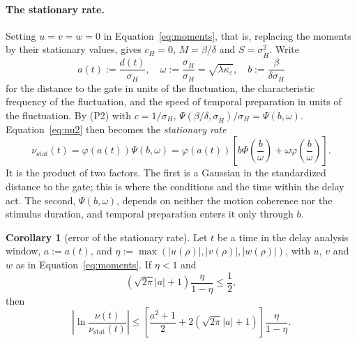 \documentclass[a4paper,11pt]{article}
\theoremstyle{definition}
\newtheorem{corollary}[proposition]{Corollary}
\newcommand{\nustat}{{\nu }_{\mathrm{stat}}}
\newcommand{\1}{\mathbbm{1}}
\begin{document}
\paragraph{The stationary rate.} Setting $u=v=w=0$ in Equation~\eqref{eq:moments}, that is, replacing the moments by their stationary values, gives ${c}_{H}=0$, $M=\beta /\delta $ and $S={\sigma }_{\dot{H}}^{2}$. Write
\begin{equation*}
a\left(t\right):=\frac{d\left(t\right)}{{\sigma }_{H}}, \quad \omega :=\frac{{\sigma }_{\dot{H}}}{{\sigma }_{H}}=\sqrt{\lambda \kappa_{\varepsilon} }, \quad b:=\frac{\beta}{\delta\sigma_{H}}
\end{equation*}
for the distance to the gate in units of the fluctuation, the characteristic frequency of the fluctuation, and the speed of temporal preparation in units of the fluctuation. By (P2) with $c=1/\sigma_{H}$, $\Psi\left(\beta/\delta,\sigma_{\dot{H}}\right)/\sigma_{H}=\Psi(b,\omega)$. Equation~\eqref{eq:nu2} then becomes the \emph{stationary rate}
\begin{equation}
\nustat \left(t\right)=\varphi \left(a\left(t\right)\right)\Psi(b,\omega)=\varphi \left(a\left(t\right)\right)\left[b\Phi \left(\frac{b}{\omega}\right)+\omega \varphi \left(\frac{b}{\omega}\right)\right].
\label{eq:nu_asymp}
\end{equation}
It is the product of two factors. The first is a Gaussian in the standardized distance to the gate; this is where the conditions and the time within the delay act. The second, $\Psi(b,\omega)$, depends on neither the motion coherence nor the stimulus duration, and temporal preparation enters it only through $b$.

\begin{corollary}[error of the stationary rate]\label{cor:approx}
Let $t$ be a time in the delay analysis window, $a:=a(t)$, and $\eta :=\max \left(\left|u\left(\rho \right)\right|,\left|v\left(\rho \right)\right|,\left|w\left(\rho \right)\right|\right)$, with $u$, $v$ and $w$ as in Equation~\eqref{eq:moments}. If $\eta<1$ and
\begin{equation*}
\left(\sqrt{2\pi}|a|+1\right)\frac{\eta}{1-\eta}\le\frac{1}{2},
\end{equation*}
then
\begin{equation*}
\left|\ln \frac{\nu \left(t\right)}{\nustat \left(t\right)}\right|\le \left[\frac{a^{2}+1}{2}+2\left(\sqrt{2\pi}|a|+1\right)\right]\frac{\eta}{1-\eta}.
\end{equation*}
\end{corollary}
\end{document}
